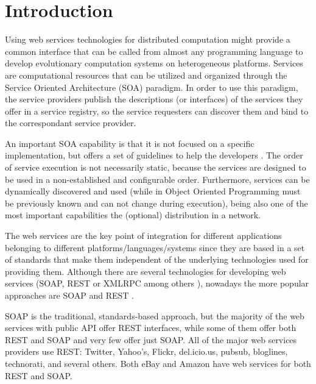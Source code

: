 \documentclass[final,1p,times]{elsarticle}
\begin{document}

\section{Introduction}
\label{sec:introduction}

Using web services technologies for distributed computation might provide a common interface that can be called from almost any programming language to develop evolutionary computation systems on heterogeneous platforms. 
Services are computational resources that can be utilized and organized through the Service Oriented Architecture (SOA) \cite{PAPAZOGLOU} paradigm. 
In order to use this paradigm, the service providers publish the descriptions (or interfaces) of the services they offer in a service registry, so the service requesters can discover them and bind to the correspondant service provider.

An important SOA capability is that it is not focused on a specific implementation, but offers a set of guidelines to help the developers \cite{SOMA}. 
The order of service execution is not necessarily static, because the services are designed to be used in a non-established and configurable order.
Furthermore, services can be dynamically discovered and used (while in Object Oriented Programming must be previously known and can not change during execution), being also one of the most important capabilities the (optional) distribution in a network.

The web services are the key point of integration for different applications belonging to different platforms/languages/systems since they are based in a set of standards that make them independent of the underlying technologies used for providing them.
Although there are several technologies for developing web services
(SOAP, REST or XMLRPC among others \cite{Daigneau2011}),
nowadays the more popular approaches are SOAP  \cite{SOAP} and REST \cite{Fielding2000,Fielding2002,Vinoski2008}.

%
%
SOAP is the traditional, standards-based approach, but the majority of the web services with public API offer REST interfaces, while some of them offer both REST and SOAP and very few offer just SOAP.
All of the major web services providers use REST: Twitter, Yahoo's, Flickr, del.icio.us, pubsub, bloglines, technorati, and several others. Both eBay and Amazon have web services for both REST and SOAP.
\end{document}
